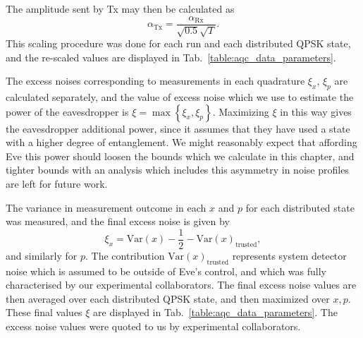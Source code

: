 The amplitude sent by Tx may then be calculated as
\begin{equation}
\alpha_{\text{Tx}} = \frac{\alpha_{\text{Rx}}}{\sqrt{0.5} \sqrt{T}}.
\end{equation}
This scaling procedure was done for each run and each distributed QPSK state, and the re-scaled values are displayed in Tab.~\ref{table:aqc_data_parameters}.

The excess noises corresponding to measurements in each quadrature $\xi_x$, $\xi_p$ are calculated separately, and the value of excess noise which we use to estimate the power of the eavesdropper is $\xi = \max \left\{\xi_x, \xi_p\right\}$. Maximizing $\xi$ in this way gives the eavesdropper additional power, since it assumes that they have used a state with a higher degree of entanglement. We might reasonably expect that affording Eve this power should loosen the bounds which we calculate in this chapter, and tighter bounds with an analysis which includes this asymmetry in noise profiles are left for future work.

The variance in measurement outcome in each $x$ and $p$ for each distributed state was measured, and the final excess noise is given by
\begin{equation}
\xi_{x} = \text{Var}\left(x\right) - \frac{1}{2} - \text{Var}\left(x\right)_{\text{trusted}},
\end{equation} %
and similarly for $p$. The contribution $\text{Var}\left(x\right)_{\text{trusted}}$ represents system detector noise which is assumed to be outside of Eve's control, and which was fully characterised by our experimental collaborators. The final excess noise values are then averaged over each distributed QPSK state, and then maximized over $x, p$. These final values $\xi$ are displayed in Tab.~\ref{table:aqc_data_parameters}. The excess noise values were quoted to us by experimental collaborators.



